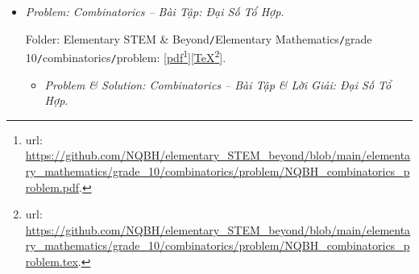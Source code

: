 \documentclass[12pt]{article}
\begin{document}
\begin{itemize}
	Folder: {\sf Elementary STEM \& Beyond{\tt/}Elementary Mathematics{\tt/}grade 10{\tt/}vector{\tt/}problem}: [\href{https://github.com/NQBH/elementary_STEM_beyond/blob/main/elementary_mathematics/grade_10/vector/problem/NQBH_vector_problem.pdf}{pdf}\footnote{{\sc url}: \url{https://github.com/NQBH/elementary_STEM_beyond/blob/main/elementary_mathematics/grade_10/vector/problem/NQBH_vector_problem.pdf}.}][\href{https://github.com/NQBH/elementary_STEM_beyond/blob/main/elementary_mathematics/grade_10/vector/problem/NQBH_vector_problem.tex}{\TeX}\footnote{{\sc url}: \url{https://github.com/NQBH/elementary_STEM_beyond/blob/main/elementary_mathematics/grade_10/vector/problem/NQBH_vector_problem.tex}.}].
	\begin{itemize}
		\item {\it Problem \& Solution: Vector -- Bài Tập \& Lời Giải: Vector}.
		
		Folder: {\sf Elementary STEM \& Beyond{\tt/}Elementary Mathematics{\tt/}grade 10{\tt/}vector{\tt/}solution}: [\href{https://github.com/NQBH/elementary_STEM_beyond/blob/main/elementary_mathematics/grade_10/vector/solution/NQBH_vector_solution.pdf}{pdf}\footnote{{\sc url}: \url{https://github.com/NQBH/elementary_STEM_beyond/blob/main/elementary_mathematics/grade_10/vector/solution/NQBH_vector_solution.pdf}.}][\href{https://github.com/NQBH/elementary_STEM_beyond/blob/main/elementary_mathematics/grade_10/vector/solution/NQBH_vector_solution.tex}{\TeX}\footnote{{\sc url}: \url{https://github.com/NQBH/elementary_STEM_beyond/blob/main/elementary_mathematics/grade_10/vector/solution/NQBH_vector_solution.tex}.}].
	\end{itemize}
	\item {\it Problem: Combinatorics -- Bài Tập: Đại Số Tổ Hợp}.
	
	Folder: {\sf Elementary STEM \& Beyond{\tt/}Elementary Mathematics{\tt/}grade 10{\tt/}combinatorics{\tt/}problem}: [\href{https://github.com/NQBH/elementary_STEM_beyond/blob/main/elementary_mathematics/grade_10/combinatorics/problem/NQBH_combinatorics_problem.pdf}{pdf}\footnote{{\sc url}: \url{https://github.com/NQBH/elementary_STEM_beyond/blob/main/elementary_mathematics/grade_10/combinatorics/problem/NQBH_combinatorics_problem.pdf}.}][\href{https://github.com/NQBH/elementary_STEM_beyond/blob/main/elementary_mathematics/grade_10/combinatorics/problem/NQBH_combinatorics_problem.tex}{\TeX}\footnote{{\sc url}: \url{https://github.com/NQBH/elementary_STEM_beyond/blob/main/elementary_mathematics/grade_10/combinatorics/problem/NQBH_combinatorics_problem.tex}.}].
	\begin{itemize}
		\item {\it Problem \& Solution: Combinatorics -- Bài Tập \& Lời Giải: Đại Số Tổ Hợp}.
		

\end{itemize}
\end{itemize}
\end{document}
